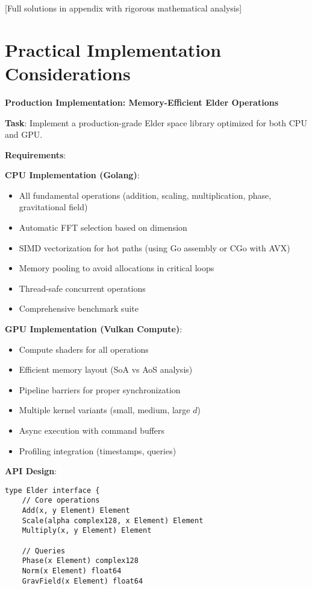 [Full solutions in appendix with rigorous mathematical analysis]

\section{Practical Implementation Considerations}

\begin{coding}
\textbf{Production Implementation: Memory-Efficient Elder Operations}

\textbf{Task}: Implement a production-grade Elder space library optimized for both CPU and GPU.

\textbf{Requirements}:

\textbf{CPU Implementation (Golang)}:
\begin{itemize}
\item All fundamental operations (addition, scaling, multiplication, phase, gravitational field)
\item Automatic FFT selection based on dimension
\item SIMD vectorization for hot paths (using Go assembly or CGo with AVX)
\item Memory pooling to avoid allocations in critical loops
\item Thread-safe concurrent operations
\item Comprehensive benchmark suite
\end{itemize}

\textbf{GPU Implementation (Vulkan Compute)}:
\begin{itemize}
\item Compute shaders for all operations
\item Efficient memory layout (SoA vs AoS analysis)
\item Pipeline barriers for proper synchronization
\item Multiple kernel variants (small, medium, large $d$)
\item Async execution with command buffers
\item Profiling integration (timestamps, queries)
\end{itemize}

\textbf{API Design}:
\begin{lstlisting}[style=golang]
type Elder interface {
    // Core operations
    Add(x, y Element) Element
    Scale(alpha complex128, x Element) Element
    Multiply(x, y Element) Element
    
    // Queries
    Phase(x Element) complex128
    Norm(x Element) float64
    GravField(x Element) float64
    

\end{lstlisting}
\end{coding}
